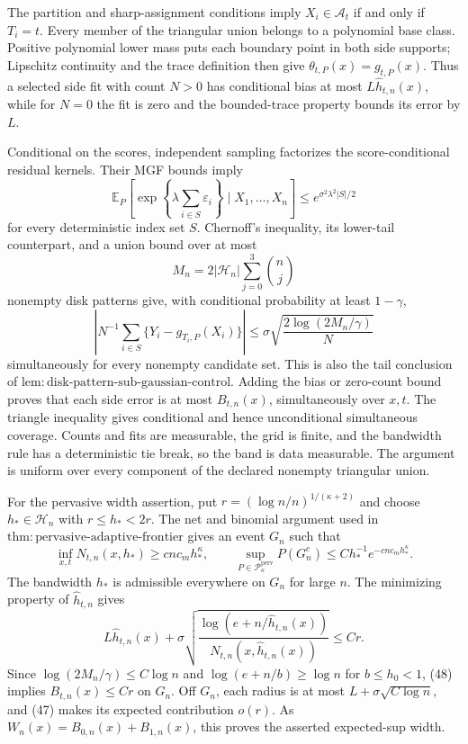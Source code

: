 The partition and sharp-assignment conditions imply \(X_i\in\mathcal A_t\) if and only if \(T_i=t\).  Every member of the triangular union belongs to a polynomial base class.  Positive polynomial lower mass puts each boundary point in both side supports; Lipschitz continuity and the trace definition then give \(\theta_{t,P}(x)=g_{t,P}(x)\).  Thus a selected side fit with count \(N>0\) has conditional bias at most \(L\widehat h_{t,n}(x)\), while for \(N=0\) the fit is zero and the bounded-trace property bounds its error by \(L\).

Conditional on the scores, independent sampling factorizes the score-conditional residual kernels.  Their MGF bounds imply
\[
 \mathbb E_P\!\left[\exp\!\left\{\lambda\sum_{i\in S}\varepsilon_i\right\}\mid X_1,\ldots,X_n\right]
 \le e^{\sigma^2\lambda^2|S|/2} \tag{45}
\]
for every deterministic index set \(S\).  Chernoff's inequality, its lower-tail counterpart, and a union bound over at most
\[
 M_n=2|\mathcal H_n|\sum_{j=0}^3\binom nj
\]
nonempty disk patterns give, with conditional probability at least \(1-\gamma\),
\[
 \left|N^{-1}\sum_{i\in S}\{Y_i-g_{T_i,P}(X_i)\}\right|
 \le\sigma\sqrt{\frac{2\log(2M_n/\gamma)}N} \tag{46}
\]
simultaneously for every nonempty candidate set.  This is also the tail conclusion of \(\mathrm{lem:disk\text{-}pattern\text{-}sub\text{-}gaussian\text{-}control}\).  Adding the bias or zero-count bound proves that each side error is at most \(B_{t,n}(x)\), simultaneously over \(x,t\).  The triangle inequality gives conditional and hence unconditional simultaneous coverage.  Counts and fits are measurable, the grid is finite, and the bandwidth rule has a deterministic tie break, so the band is data measurable.  The argument is uniform over every component of the declared nonempty triangular union.

For the pervasive width assertion, put \(r=(\log n/n)^{1/(\kappa+2)}\) and choose \(h_*\in\mathcal H_n\) with \(r\le h_*<2r\).  The net and binomial argument used in \(\mathrm{thm:pervasive\text{-}adaptive\text{-}frontier}\) gives an event \(G_n\) such that
\[
 \inf_{x,t}N_{t,n}(x,h_*)\ge cnc_mh_*^\kappa,\qquad
 \sup_{P\in\mathcal P_\kappa^{\mathrm{perv}}}P(G_n^c)
 \le Ch_*^{-1}e^{-cnc_mh_*^\kappa}. \tag{47}
\]
The bandwidth \(h_*\) is admissible everywhere on \(G_n\) for large \(n\).  The minimizing property of \(\widehat h_{t,n}\) gives
\[
 L\widehat h_{t,n}(x)+\sigma\sqrt{\frac{\log(e+n/\widehat h_{t,n}(x))}{N_{t,n}(x,\widehat h_{t,n}(x))}}
 \le Cr. \tag{48}
\]
Since \(\log(2M_n/\gamma)\le C\log n\) and \(\log(e+n/b)\ge\log n\) for \(b\le h_0<1\), (48) implies \(B_{t,n}(x)\le Cr\) on \(G_n\).  Off \(G_n\), each radius is at most \(L+\sigma\sqrt{C\log n}\), and (47) makes its expected contribution \(o(r)\).  As \(W_n(x)=B_{0,n}(x)+B_{1,n}(x)\), this proves the asserted expected-sup width.

